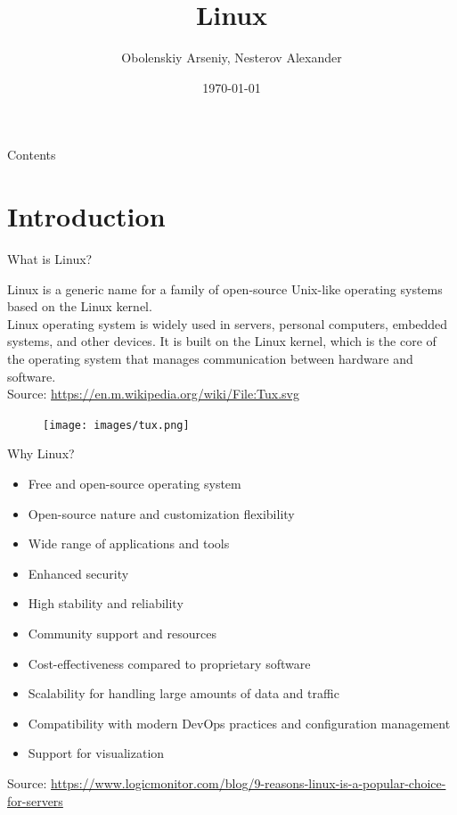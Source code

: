 \documentclass{beamer}
\title[Linux]{Linux}
\author{Obolenskiy Arseniy, Nesterov Alexander}
\institute{ITLab}
\date{\today}
\begin{document}
\begin{frame}
    \titlepage%
\end{frame}

\begin{frame}{Contents}
    \tableofcontents
\end{frame}

\section{Introduction}


\begin{frame}{What is Linux?}
  \begin{minipage}[t]{0.6\textwidth}
    Linux is a generic name for a family of open-source Unix-like operating systems based on the Linux kernel. \\
    Linux operating system is widely used in servers, personal computers, embedded systems, and other devices. It is built on the Linux kernel, which is the core of the operating system that manages communication between hardware and software.
    \vspace{10pt}
    \\
    \footnotesize Source: \href{https://en.m.wikipedia.org/wiki/File:Tux.svg}{https://en.m.wikipedia.org/wiki/File:Tux.svg}
  \end{minipage}
  \hfill
  \begin{minipage}[t]{0.35\textwidth}
    \begin{figure}[h]
      \texttt{[image: images/tux.png]}
    \end{figure}
  \end{minipage}
\end{frame}

\begin{frame}{Why Linux?}
  \begin{itemize}
    \item Free and open-source operating system
    \item Open-source nature and customization flexibility
    \item Wide range of applications and tools
    \item Enhanced security
    \item High stability and reliability
    \item Community support and resources
    \item Cost-effectiveness compared to proprietary software
    \item Scalability for handling large amounts of data and traffic
    \item Compatibility with modern DevOps practices and configuration management
    \item Support for visualization
  \end{itemize}

  \footnotesize Source: \href{https://www.logicmonitor.com/blog/9-reasons-linux-is-a-popular-choice-for-servers}{https://www.logicmonitor.com/blog/9-reasons-linux-is-a-popular-choice-for-servers}
\end{frame}
\end{document}
